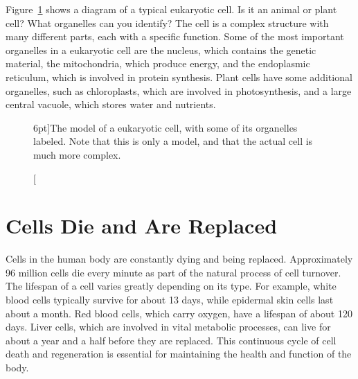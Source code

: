 Figure~\ref{fig:cell} shows a diagram of a typical eukaryotic cell. Is it an animal or plant cell? What organelles can you identify? The cell is a complex structure with many different parts, each with a specific function. Some of the most important organelles in a eukaryotic cell are the nucleus, which contains the genetic material, the mitochondria, which produce energy, and the endoplasmic reticulum, which is involved in protein synthesis. Plant cells have some additional organelles, such as chloroplasts, which are involved in photosynthesis, and a large central vacuole, which stores water and nutrients.

\begin{figure}[h!]
    \caption[][6pt]{The model of a eukaryotic cell, with some of its organelles labeled. Note that this is only a model, and that the actual cell is much more complex.}
    \label{fig:cell}
\end{figure}

\section{Cells Die and Are Replaced}

Cells in the human body are constantly dying and being replaced. Approximately 96 million cells die every minute as part of the natural process of cell turnover. The lifespan of a cell varies greatly depending on its type. For example, white blood cells typically survive for about 13 days, while epidermal skin cells last about a month. Red blood cells, which carry oxygen, have a lifespan of about 120 days. Liver cells, which are involved in vital metabolic processes, can live for about a year and a half before they are replaced. This continuous cycle of cell death and regeneration is essential for maintaining the health and function of the body.


